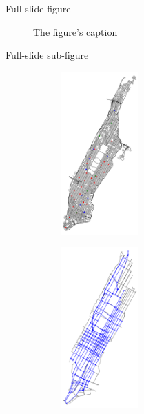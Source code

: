 \begin{frame}{Full-slide figure}

  \begin{figure}
    \centering
    \caption{The figure's caption}
  \end{figure}


\end{frame}


\begin{frame}{Full-slide sub-figure}

  \begin{figure}
  \begin{subfigure}[h]{0.45\textwidth}
    \centering
    \includegraphics[width=3cm]{assets/img/new_york_vanilla_info.png}
  \end{subfigure}
  \begin{subfigure}[h]{0.45\textwidth}
    \centering
    \includegraphics[width=3cm]{assets/img/new_york_simplified_roads.png}
  \end{subfigure}

   
  \end{figure}


\end{frame}